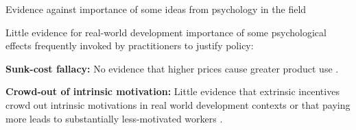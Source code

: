 \documentclass[aspectratio=169, 10pt, handout]{beamer}
\newenvironment{wideitemize}{\itemize\addtolength{\itemsep}{10pt}}{\enditemize}
\begin{document}
\begin{frame}{Evidence against importance of some ideas from psychology in the field}

\begin{wideitemize}

	\item Little evidence for real-world development importance of some psychological effects frequently invoked by practitioners to justify policy:
	
	\bigskip
	
	\begin{wideitemize}

	\item \textbf{Sunk-cost fallacy:} No evidence that higher prices cause greater product use \cite{ashraf2010can,cohen2010free}. 
	\item \textbf{Crowd-out of intrinsic motivation:} Little evidence that extrinsic incentives crowd out intrinsic motivations in real world development contexts or that paying more leads to substantially less-motivated workers \citep{dal2013strengthening,ashraf2014no,ashraf2018losing}.
	
	\end{wideitemize}

\end{wideitemize}


\end{frame}
\end{document}
